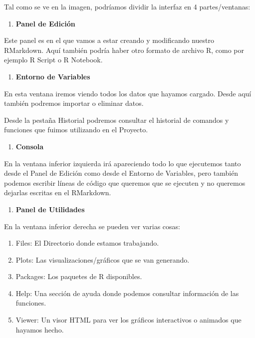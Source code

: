 \documentclass[
  spanish,
]{book}
\providecommand{\tightlist}{%
  \setlength{\itemsep}{0pt}\setlength{\parskip}{0pt}}
\begin{document}
Tal como se ve en la imagen, podríamos dividir la interfaz en 4 partes/ventanas:

\begin{enumerate}
\def\labelenumi{\arabic{enumi}.}
\tightlist
\item
  \textbf{Panel de Edición}
\end{enumerate}

Este panel es en el que vamos a estar creando y modificando nuestro RMarkdown. Aquí también podría haber otro formato de archivo R, como por ejemplo R Script o R Notebook.

\begin{enumerate}
\def\labelenumi{\arabic{enumi}.}
\setcounter{enumi}{1}
\tightlist
\item
  \textbf{Entorno de Variables}
\end{enumerate}

En esta ventana iremos viendo todos los datos que hayamos cargado. Desde aquí también podremos importar o eliminar datos.

Desde la pestaña Historial podremos consultar el historial de comandos y funciones que fuimos utilizando en el Proyecto.

\begin{enumerate}
\def\labelenumi{\arabic{enumi}.}
\setcounter{enumi}{2}
\tightlist
\item
  \textbf{Consola}
\end{enumerate}

En la ventana inferior izquierda irá apareciendo todo lo que ejecutemos tanto desde el Panel de Edición como desde el Entorno de Variables, pero también podemos escribir líneas de código que queremos que se ejecuten y no queremos dejarlas escritas en el RMarkdown.

\begin{enumerate}
\def\labelenumi{\arabic{enumi}.}
\setcounter{enumi}{3}
\tightlist
\item
  \textbf{Panel de Utilidades}
\end{enumerate}

En la ventana inferior derecha se pueden ver varias cosas:

\begin{enumerate}
\def\labelenumi{\alph{enumi}.}
\item
  Files: El Directorio donde estamos trabajando.
\item
  Plots: Las visualizaciones/gráficos que se van generando.
\item
  Packages: Los paquetes de R disponibles.
\item
  Help: Una sección de ayuda donde podemos consultar información de las funciones.
\item
  Viewer: Un visor HTML para ver los gráficos interactivos o animados que hayamos hecho.
\end{enumerate}
\end{document}
